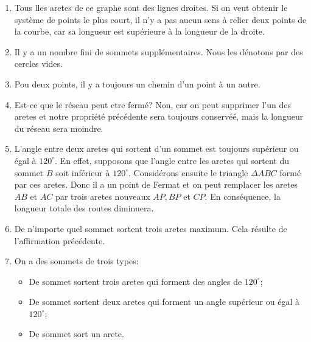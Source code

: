 \documentclass[10pt,a4paper]{article}%
\theoremstyle{theorem}
\theoremstyle{definition}
\begin{document}
			\begin{enumerate}
				\item Tous lles aretes de ce graphe sont des lignes droites. Si on veut obtenir le système de points le plus court, il n'y a pas aucun sens à relier deux points de la courbe, car sa longueur est supérieure à la longueur de la droite.
				
				\item Il y a  un nombre fini de sommets supplémentaires. Nous les dénotons par des cercles vides.
				
				\item Pou deux points, il y a toujours  un chemin d'un point à un autre.
				
				\item Est-ce que le réseau peut etre fermé? Non, car on peut supprimer l'un des aretes et notre propriété précédente sera toujours conservéé, mais la longueur du réseau sera moindre.
				
				\item L'angle entre deux aretes qui sortent d'un sommet est toujours supérieur ou égal à $120^\circ$. En effet, supposons que l'angle entre les aretes qui sortent du sommet $B$ soit inférieur à $120^\circ$. Considérons ensuite le triangle $\Delta ABC$ formé par ces aretes. Donc il a un point de Fermat et on peut remplacer les aretes $AB$ et $AC$ par trois aretes nouveaux $AP,BP$ et $CP$. En conséquence, la longueur totale des routes diminuera. 
				\begin{center}
				\end{center}
			
				\item De n'importe quel sommet sortent trois aretes maximum. Cela résulte de l'affirmation précédente.
				
				\item On a des sommets de trois types:
					\begin{itemize}
						\item De sommet sortent trois aretes qui forment des angles de $120^\circ$;
						\item De sommet sortent deux aretes qui forment un angle supérieur ou égal à $120^\circ$;
						\item De sommet sort un arete.
					\end{itemize}
				

\end{enumerate}
\end{document}
